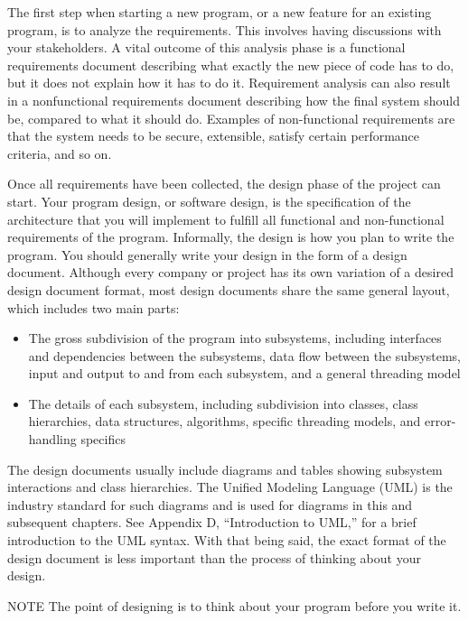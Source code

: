 The first step when starting a new program, or a new feature for an existing program, is to analyze the requirements. This involves having discussions with your stakeholders. A vital outcome of this analysis phase is a functional requirements document describing what exactly the new piece of code has to do, but it does not explain how it has to do it. Requirement analysis can also result in a nonfunctional requirements document describing how the final system should be, compared to what it should do. Examples of non-functional requirements are that the system needs to be secure, extensible, satisfy certain performance criteria, and so on.

Once all requirements have been collected, the design phase of the project can start. Your program design, or software design, is the specification of the architecture that you will implement to fulfill all functional and non-functional requirements of the program. Informally, the design is how you plan to write the program. You should generally write your design in the form of a design document. Although every company or project has its own variation of a desired design document format, most design documents share the same general layout, which includes two main parts:

\begin{itemize}
\item
The gross subdivision of the program into subsystems, including interfaces and dependencies between the subsystems, data flow between the subsystems, input and output to and from each subsystem, and a general threading model

\item
The details of each subsystem, including subdivision into classes, class hierarchies, data structures, algorithms, specific threading models, and error-handling specifics
\end{itemize}

The design documents usually include diagrams and tables showing subsystem interactions and class hierarchies. The Unified Modeling Language (UML) is the industry standard for such diagrams and is used for diagrams in this and subsequent chapters. See Appendix D, “Introduction to UML,” for a brief introduction to the UML syntax. With that being said, the exact format of the design document is less important than the process of thinking about your design.

\begin{myNotic}{NOTE}
The point of designing is to think about your program before you write it.
\end{myNotic}

